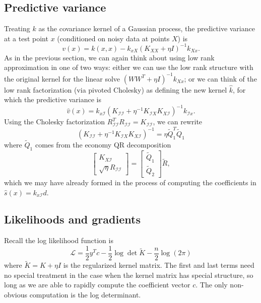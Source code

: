 \documentclass[12pt, leqno]{article} %
\newcommand{\calI}{\mathcal{I}}
\begin{document}
\subsection{Predictive variance}

Treating $k$ as the covariance kernel of a Gaussian process,
the predictive variance at a test point $x$
(conditioned on noisy data at points $X$) is
\[
  v(x) = k(x,x) - k_{xX} (K_{XX} + \eta I)^{-1} k_{Xx}.
\]
As in the previous section, we can again think about using low rank
approximation in one of two ways: either we can use the low rank
structure with the original kernel for the linear solve
$(WW^T + \eta I)^{-1} k_{Xx}$; or we can think of the low rank
factorization (via pivoted Cholesky) as defining the new kernel $\hat{k}$,
for which the predictive variance is
\[
  \hat{v}(x) =
    k_{x \calI} (K_{\calI \calI} + \eta^{-1} K_{\calI X} K_{X \calI})^{-1} k_{\calI x}.
\]
Using the Cholesky factorization
$R_{\calI \calI}^T R_{\calI \calI} = K_{\calI \calI}$, we can rewrite
\[
  (K_{\calI \calI} + \eta^{-1} K_{\calI X} K_{X \calI})^{-1} = 
  \eta \tilde{Q}_1^T \tilde{Q}_1
\]
where $\tilde{Q}_1$ comes from the economy QR decomposition
\[
  \begin{bmatrix} K_{X \calI} \\ \sqrt{\eta} R_{\calI \calI} \end{bmatrix} =
  \begin{bmatrix} \tilde{Q}_1 \\ \tilde{Q}_2 \end{bmatrix}
  \tilde{R},
\]
which we may have already formed in the process of computing the
coefficients in $\hat{s}(x) = k_{x \calI} d$.


\subsection{Likelihoods and gradients}

Recall the log likelihood function is
\[
  \mathcal{L} =
  \frac{1}{2} y^T c - \frac{1}{2} \log \det \tilde{K} - \frac{n}{2} \log(2\pi)
\]
where $\tilde{K} = K + \eta I$ is the regularized kernel matrix.
The first and last terms need no special treatment in the case when
the kernel matrix has special structure, so long as we are able to
rapidly compute the coefficient vector $c$.  The only non-obvious
computation is the log determinant.
\end{document}
